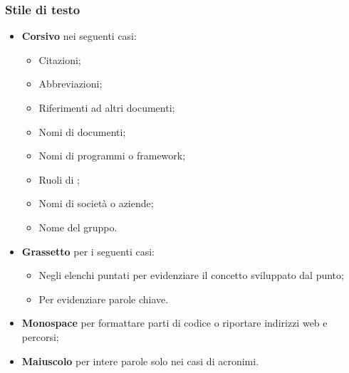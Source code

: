 \subsubsection{Stile di testo}
\begin{itemize}
\item \textbf{Corsivo}  nei seguenti casi:
  \begin{itemize}
  \item Citazioni;
  \item Abbreviazioni;
  \item Riferimenti ad altri documenti;
  \item Nomi di documenti;
  \item Nomi di programmi o framework;
  \item Ruoli di ;
  \item Nomi di societ\`a o aziende;
  \item Nome del gruppo.
  \end{itemize}
\item \textbf{Grassetto} per i seguenti casi:
  \begin{itemize}
  \item Negli elenchi puntati per evidenziare il concetto sviluppato dal punto;
  \item Per evidenziare parole chiave.
  \end{itemize}
\item \textbf{Monospace} per formattare parti di codice o riportare indirizzi web e percorsi;
\item \textbf{Maiuscolo} per intere parole solo nei casi di acronimi.
\end{itemize}

